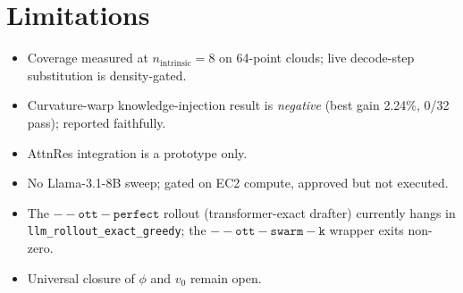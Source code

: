 \documentclass[11pt]{article}
\begin{document}
\section{Limitations}

\begin{itemize}
  \item Coverage measured at $n_{\mathrm{intrinsic}}=8$ on 64-point clouds;
        live decode-step substitution is density-gated.
  \item Curvature-warp knowledge-injection result is \emph{negative} (best
        gain 2.24\%, 0/32 pass); reported faithfully.
  \item AttnRes integration is a prototype only.
  \item No Llama-3.1-8B sweep; gated on EC2 compute, approved but not
        executed.
  \item The $\mathtt{-{}-ott-perfect}$ rollout (transformer-exact drafter)
        currently hangs in \texttt{llm\_rollout\_exact\_greedy}; the
        $\mathtt{-{}-ott-swarm-k}$ wrapper exits non-zero.
  \item Universal closure of $\phi$ and $v_0$ remain open.
\end{itemize}

\printbibliography
\end{document}
